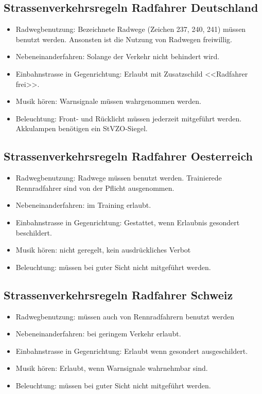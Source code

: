 \documentclass[a4paper,DIV13,BCOR1cm]{scrbook}
\begin{document}
\subsection{Strassenverkehrsregeln Radfahrer Deutschland}
\begin{itemize}
        \item Radwegbenutzung: Bezeichnete Radwege (Zeichen 237, 240, 241) müssen benutzt werden. Ansonsten ist die Nutzung von Radwegen freiwillig.
        \item Nebeneinanderfahren: Solange der Verkehr nicht behindert wird. 
        \item Einbahnstrasse in Gegenrichtung: Erlaubt mit Zusatzschild <<Radfahrer frei>>.
        \item Musik hören: Warnsignale müssen wahrgenommen werden.
        \item Beleuchtung: Front- und Rücklicht müssen jederzeit mitgeführt werden. Akkulampen benötigen ein StVZO-Siegel.
\end{itemize}

\subsection{Strassenverkehrsregeln Radfahrer Oesterreich}
\begin{itemize}
        \item Radwegbenutzung: Radwege müssen benutzt werden. Trainierede Rennradfahrer sind von der Pflicht ausgenommen.
        \item Nebeneinanderfahren: im Training erlaubt. 
        \item Einbahnstrasse in Gegenrichtung: Gestattet, wenn Erlaubnis gesondert beschildert.
        \item Musik hören: nicht geregelt, kein ausdrückliches Verbot
        \item Beleuchtung: müssen bei guter Sicht nicht mitgeführt werden.
\end{itemize}

\subsection{Strassenverkehrsregeln Radfahrer Schweiz}
\begin{itemize}
        \item Radwegbenutzung: müssen auch von Rennradfahrern benutzt werden
        \item Nebeneinanderfahren: bei geringem Verkehr erlaubt.
        \item Einbahnstrasse in Gegenrichtung: Erlaubt wenn gesondert ausgeschildert.
        \item Musik hören: Erlaubt, wenn Warnsignale wahrnehmbar sind.
        \item Beleuchtung: müssen bei guter Sicht nicht mitgeführt werden.
\end{itemize}
\end{document}
